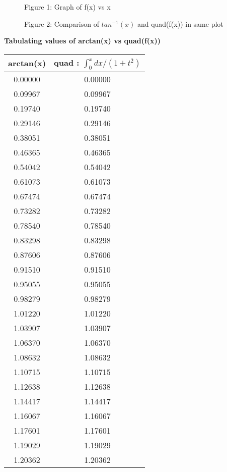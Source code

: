 \documentclass[a4paper]{article}
\begin{document}
\begin{figure}[H]
    \centering
    \caption{Figure 1: Graph of f(x) vs x}
	\end{figure}
	
	\begin{figure}[H]
    \centering
    \caption{Figure 2: Comparison of $tan^{-1}(x)$ and quad(f(x)) in same plot}
	\end{figure}
	

\begin{table}[H]
\textbf{Tabulating values of arctan(x) vs quad(f(x))}\par\medskip
\begin{tabular}{|c|c|}
\hline
arctan(x) & quad : $\int_{0}^{x} dx/(1+t^{2}) $  \\
\hline
0.00000 & 0.00000 \\
 0.09967 & 0.09967 \\
 0.19740 & 0.19740 \\
 0.29146 & 0.29146 \\
 0.38051 & 0.38051 \\
 0.46365 & 0.46365 \\
 0.54042 & 0.54042 \\
 0.61073 & 0.61073 \\
 0.67474 & 0.67474 \\
 0.73282 & 0.73282 \\
 0.78540 & 0.78540 \\
 0.83298 & 0.83298 \\
 0.87606 & 0.87606 \\
 0.91510 & 0.91510 \\
 0.95055 & 0.95055 \\
 0.98279 & 0.98279 \\
 1.01220 & 1.01220 \\
 1.03907 & 1.03907 \\
 1.06370 & 1.06370 \\
 1.08632 & 1.08632 \\
 1.10715 & 1.10715 \\
 1.12638 & 1.12638 \\
 1.14417 & 1.14417 \\
 1.16067 & 1.16067 \\
 1.17601 & 1.17601 \\
 1.19029 & 1.19029 \\
 1.20362 & 1.20362 \\

\end{tabular}
\end{table}
\end{document}
